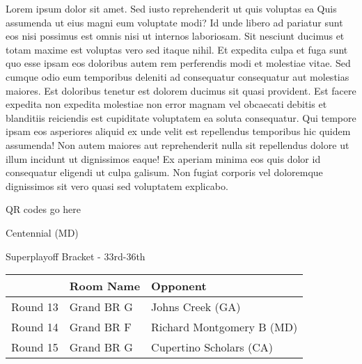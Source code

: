 \documentclass{article}%
\begin{document}
\vspace*{8pt}%
\linebreak%
\newline%
\newline%
Lorem ipsum dolor sit amet. Sed iusto reprehenderit ut quis voluptas ea Quis assumenda ut eius magni eum voluptate modi? Id unde libero ad pariatur sunt eos nisi possimus est omnis nisi ut internos laboriosam. Sit nesciunt ducimus et totam maxime est voluptas vero sed itaque nihil. Et expedita culpa et fuga sunt quo esse ipsam eos doloribus autem rem perferendis modi et molestiae vitae.\newline%
\newline%
Sed cumque odio eum temporibus deleniti ad consequatur consequatur aut molestias maiores. Est doloribus tenetur est dolorem ducimus sit quasi provident. Est facere expedita non expedita molestiae non error magnam vel obcaecati debitis et blanditiis reiciendis est cupiditate voluptatem ea soluta consequatur. Qui tempore ipsam eos asperiores aliquid ex unde velit est repellendus temporibus hic quidem assumenda!\newline%
\newline%
Non autem maiores aut reprehenderit nulla sit repellendus dolore ut illum incidunt ut dignissimos eaque! Ex aperiam minima eos quis dolor id consequatur eligendi ut culpa galisum. Non fugiat corporis vel doloremque dignissimos sit vero quasi sed voluptatem explicabo.\newline%
\newline%
%
\vspace*{30pt}%
\begin{center}%
\begin{Huge}%
QR codes go here%
\end{Huge}%
\end{center}%
\newpage%
\begin{center}%
\begin{Huge}%
Centennial (MD)%
\end{Huge}%
\vspace*{8pt}%
\linebreak%
\begin{Large}%
Superplayoff Bracket {-} 33rd{-}36th%
\end{Large}%
\end{center}%
%
\begin{tabularx}{\textwidth}{|c|Y|Y|}%
\hline%
&Room Name&Opponent\\%
\hline%
Round 13&Grand BR G&Johns Creek (GA)\\%
Round 14&Grand BR F&Richard Montgomery B (MD)\\%
Round 15&Grand BR G&Cupertino Scholars (CA)\\%
\hline%
\end{tabularx}%
\end{document}
